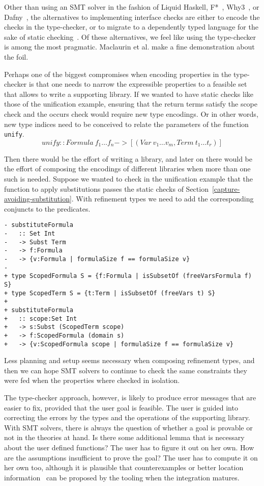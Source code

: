 \documentclass[sigconf, anonymous, review]{acmart}
\newcommand{\tc}[1]{{\small\texttt{#1}}}
\begin{document}
Other than using an SMT solver in the fashion of Liquid Haskell, F*~\cite{swamy16},
Why3~\cite{filli13}, or Dafny~\cite{leino17},
the alternatives to implementing interface checks are either to encode the checks in
the type-checker, or to migrate to a dependently typed language for the sake of
static checking~\cite{haftmann10, breitner18, carr22}. Of these alternatives,
we feel like using the type-checker is among the most pragmatic. Maclaurin et al. make
a fine demonstration about the foil.

Perhaps one of the biggest compromises when encoding properties in the type-checker
is that one needs to narrow the expressible properties to a feasible set that allows
to write a supporting library. If we wanted to have static checks like those of the
unification example, ensuring that the return terms satisfy the scope check and the
occurs check would require new type encodings. Or in other words, new type indices
need to be conceived to relate the parameters of the function \tc{unify}.
$$\mathit{unify} :: \mathit{Formula}\ f_1 \ldots f_n -> [(\mathit{Var}\ v_1 \ldots v_m, \mathit{Term}\ t_1 \ldots t_r)]$$

Then there would be the effort of writing a library, and later on there would be the
effort of composing the encodings of different libraries when more than one such
is needed. Suppose we wanted to check in the unification example that the
function to apply substitutions passes the static checks of
Section~\ref{capture-avoiding-substitution}. With
refinement types we need to add the corresponding conjuncts to the predicates.

\begin{verbatim}
- substituteFormula
-   :: Set Int
-   -> Subst Term
-   -> f:Formula
-   -> {v:Formula | formulaSize f == formulaSize v}
-
+ type ScopedFormula S = {f:Formula | isSubsetOf (freeVarsFormula f) S}
+ type ScopedTerm S = {t:Term | isSubsetOf (freeVars t) S}
+
+ substituteFormula
+   :: scope:Set Int
+   -> s:Subst (ScopedTerm scope)
+   -> f:ScopedFormula (domain s)
+   -> {v:ScopedFormula scope | formulaSize f == formulaSize v}
\end{verbatim}

Less planning and setup seems necessary when composing refinement types, and
then we can hope SMT solvers to continue to check the same constraints
they were fed when the properties where checked in isolation.

The type-checker approach, however, is likely to produce error messages that
are easier to fix, provided that the user goal is feasible.
The user is guided into correcting the errors
by the types and the operations of the supporting library. With SMT solvers,
there is always the question of whether a goal is provable or not in the
theories at hand. Is there some additional lemma that is necessary about the user defined
functions? The user has to figure it out on her own. How are the assumptions
insufficient to prove the goal? The user has to compute it on her own too,
although it is plausible that counterexamples or better location information~\cite{webbers24}
can be proposed by the tooling when the integration matures.
\end{document}
